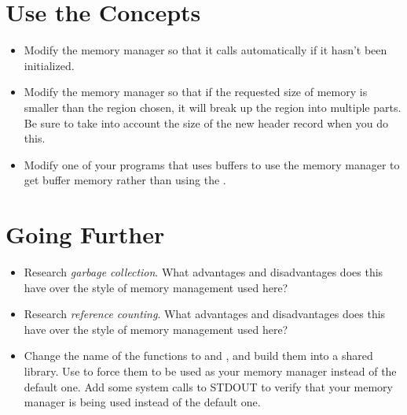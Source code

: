 \section{Use the Concepts}

\begin{itemize}\item Modify the memory manager so that it calls  automatically if it hasn't been initialized. 
\item Modify the memory manager so that if the requested size of memory is smaller than the region chosen, it will break up the region into multiple parts.  Be sure to take into account the size of the new header record when you do this. 
\item Modify one of your programs that uses buffers to use the memory manager to get buffer memory rather than using the . 
\end{itemize}

\section{Going Further}

\begin{itemize}\item Research \emph{garbage collection}.  What advantages and disadvantages does this have over the style of memory management used here? 
\item Research \emph{reference counting}.  What advantages and disadvantages does this have over the style of memory management used here? 
\item Change the name of the functions to  and , and build them into a shared library.  Use  to force them to be used as your memory manager instead of the default one.  Add some  system calls to STDOUT to verify that your memory manager is being used instead of the default one. 
\end{itemize}

